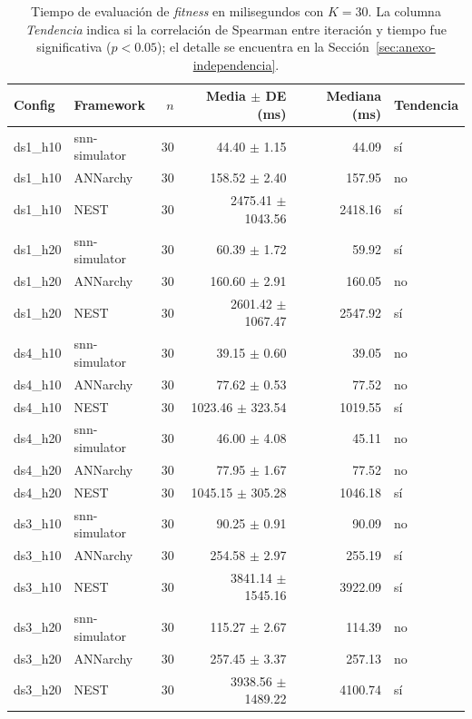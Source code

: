 \begin{table}[htbp]
\centering
\small
\caption{Tiempo de evaluación de \textit{fitness} en milisegundos con \(K = 30\). La columna \textit{Tendencia} indica si la correlación de Spearman entre iteración y tiempo fue significativa ($p<0.05$); el detalle se encuentra en la Sección~\ref{sec:anexo-independencia}.}
\label{tab:framework-evals-res}
\begin{tabular}{llrrrl}
\toprule
Config & Framework & \(n\) & Media \(\pm\) DE (ms) & Mediana (ms) & Tendencia \\
\midrule
ds1\_h10 & snn-simulator & 30 & 44.40 \(\pm\) 1.15   & 44.09 & sí \\
ds1\_h10 & ANNarchy      & 30 & 158.52 \(\pm\) 2.40  & 157.95 & no \\
ds1\_h10 & NEST          & 30 & 2475.41 \(\pm\) 1043.56 & 2418.16 & sí \\ \hline
ds1\_h20 & snn-simulator & 30 & 60.39 \(\pm\) 1.72   & 59.92 & sí \\
ds1\_h20 & ANNarchy      & 30 & 160.60 \(\pm\) 2.91  & 160.05 & no \\
ds1\_h20 & NEST          & 30 & 2601.42 \(\pm\) 1067.47 & 2547.92 & sí \\ \hline
ds4\_h10 & snn-simulator & 30 & 39.15 \(\pm\) 0.60   & 39.05 & no \\
ds4\_h10 & ANNarchy      & 30 & 77.62 \(\pm\) 0.53   & 77.52 & no \\
ds4\_h10 & NEST          & 30 & 1023.46 \(\pm\) 323.54 & 1019.55 & sí \\ \hline
ds4\_h20 & snn-simulator & 30 & 46.00 \(\pm\) 4.08   & 45.11 & no \\
ds4\_h20 & ANNarchy      & 30 & 77.95 \(\pm\) 1.67   & 77.52 & no \\
ds4\_h20 & NEST          & 30 & 1045.15 \(\pm\) 305.28 & 1046.18 & sí \\ \hline
ds3\_h10 & snn-simulator & 30 & 90.25 \(\pm\) 0.91   & 90.09 & no \\
ds3\_h10 & ANNarchy      & 30 & 254.58 \(\pm\) 2.97  & 255.19 & sí \\
ds3\_h10 & NEST          & 30 & 3841.14 \(\pm\) 1545.16 & 3922.09 & sí \\ \hline
ds3\_h20 & snn-simulator & 30 & 115.27 \(\pm\) 2.67  & 114.39 & no \\
ds3\_h20 & ANNarchy      & 30 & 257.45 \(\pm\) 3.37  & 257.13 & no \\
ds3\_h20 & NEST          & 30 & 3938.56 \(\pm\) 1489.22 & 4100.74 & sí \\
\bottomrule
\end{tabular}
\end{table}



